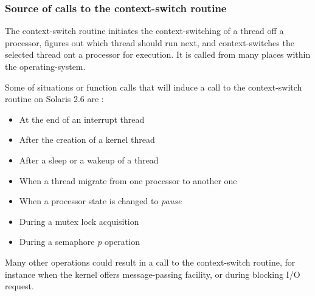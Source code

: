 \begin{frame}
\frametitle{Source of calls to the context-switch routine}

The context-switch routine initiates the context-switching of a thread off a processor, figures out which thread should run next, and context-switches the selected thread ont a processor for execution. It is called from many places within the operating-system.

\-

Some of situations or function calls that will induce a call to the context-switch routine on Solaris 2.6 are :

\begin{itemize}
\item
At the end of an interrupt thread
\item
After the creation of a kernel thread
\item
After a sleep or a wakeup of a thread
\item
When a thread migrate from one processor to another one
\item
When a processor state is changed to \textit{pause}
\item
During a mutex lock acquisition
\item
During a semaphore \textit{p} operation
\end{itemize}

\-

Many other operations could result in a call to the context-switch routine, for instance when the kernel offers message-passing facility, or during blocking I/O request.

\end{frame}


